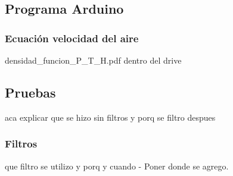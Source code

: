     \subsection{Programa Arduino}
        \subsubsection{Ecuación velocidad del aire}
		densidad_funcion_P_T_H.pdf  dentro del drive
    \subsection{Pruebas}
    aca explicar que se hizo sin filtros y porq se filtro despues
        \subsubsection{Filtros}
        que filtro se utilizo y porq y cuando
    - Poner donde se agrego.

\newpage